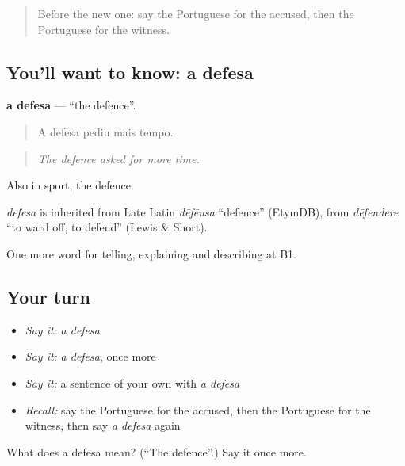 \begin{quote}
Before the new one: say the Portuguese for the accused, then the Portuguese for the witness.
\end{quote}

\subsection*{You'll want to know: a defesa}
\textbf{a defesa} — \textquotedblleft{}the defence\textquotedblright{}.

\begin{quote}
A defesa pediu mais tempo.
\end{quote}

\begin{quote}
\emph{The defence asked for more time.}
\end{quote}

Also in sport, the defence.

\begin{cousinweb}
\emph{defesa} is inherited from Late Latin \emph{dēfēnsa} \textquotedblleft{}defence\textquotedblright{} (EtymDB), from \emph{dēfendere} \textquotedblleft{}to ward off, to defend\textquotedblright{} (Lewis \& Short).
\end{cousinweb}

\begin{grammarlens}[title={What you've built}]
One more word for telling, explaining and describing at B1.
\end{grammarlens}

\subsection*{Your turn}
\begin{itemize}
\raggedright
  \item \emph{Say it:} \emph{a defesa}
  \item \emph{Say it:} \emph{a defesa}, once more
  \item \emph{Say it:} a sentence of your own with \emph{a defesa}
  \item \emph{Recall:} say the Portuguese for the accused, then the Portuguese for the witness, then say \emph{a defesa} again
\end{itemize}

\begin{tcolorbox}[breakable,colback=teal!4,colframe=teal!35!black,title={Before you move on}]
What does a defesa mean? (\textquotedblleft{}The defence\textquotedblright{}.) Say it once more.
\end{tcolorbox}
